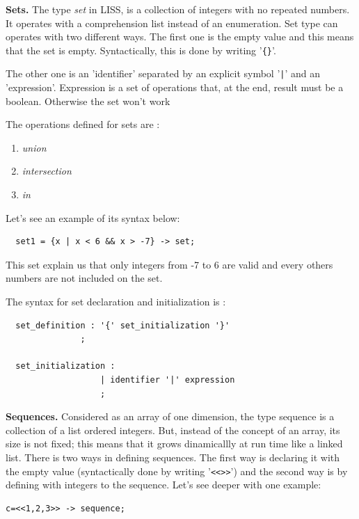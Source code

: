 \documentclass[
  oneside,
  11pt, a4paper,
  footinclude=true,
  headinclude=true,
  cleardoublepage=empty
]{scrbook}
\begin{document}
\bigbreak

\textbf{Sets.}
The type \textit{set} in LISS, is a collection of integers with no repeated numbers.
It operates with a comprehension list instead of an enumeration.
Set type can operates with two different ways.
The first one is the empty value and this means that the set is empty. Syntactically, this is done by writing '\verb+{}+'.

The other one is an 'identifier' separated by an explicit symbol '\verb+|+' and an 'expression'. Expression is a set of operations that, at the end, result must be a boolean. Otherwise the set won't work

The operations defined for sets are :
\begin{enumerate}
\item \textit{union}
\item \textit{intersection}
\item \textit{in}
\end{enumerate}


Let's see an example of its syntax below:

\begin{lstlisting}
  set1 = {x | x < 6 && x > -7} -> set;
\end{lstlisting}

This set explain us that only integers from -7 to 6 are valid and every others numbers are not included on the set.

The syntax for set declaration and initialization is :

\begin{lstlisting}
  set_definition : '{' set_initialization '}'
               ;

  set_initialization :
                   | identifier '|' expression
                   ;
\end{lstlisting}

\bigbreak

\textbf{Sequences.}
Considered as an array of one dimension, the type sequence is a collection of a list ordered integers. But, instead of the concept of an array, its size is not fixed; this means that it grows dinamicallly at run time like a linked list.
There is two ways in defining sequences.
The first way is declaring it with the empty value (syntactically done by writing '\verb+<<>>+') and the second way is by defining with integers to the sequence.
Let's see deeper with one example:

\begin{lstlisting}[caption={Example of valid operations using sequence on LISS},label={lst:sequence_example_use}]
  c=<<1,2,3>> -> sequence;
\end{lstlisting}
\end{document}
